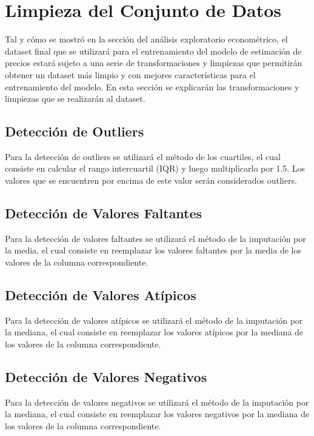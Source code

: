 \section{Limpieza del Conjunto de Datos}

Tal y cómo se mostró en la sección del análisis exploratorio econométrico, el
dataset final que se utilizará para el entrenamiento del modelo de estimación
de precios estará sujeto a una serie de transformaciones y limpiezas que
permitirán obtener un dataset más limpio y con mejores características para
el entrenamiento del modelo. En esta sección se explicarán las transformaciones
y limpiezas que se realizarán al dataset.

\subsection{Detección de Outliers}

Para la detección de outliers se utilizará el método de los cuartiles, el cual
consiste en calcular el rango intercuartil (IQR) y luego multiplicarlo por 1.5.
Los valores que se encuentren por encima de este valor serán considerados
outliers.

\subsection{Detección de Valores Faltantes}

Para la detección de valores faltantes se utilizará el método de la imputación
por la media, el cual consiste en reemplazar los valores faltantes por la media
de los valores de la columna correspondiente.

\subsection{Detección de Valores Atípicos}

Para la detección de valores atípicos se utilizará el método de la imputación
por la mediana, el cual consiste en reemplazar los valores atípicos por la
mediana de los valores de la columna correspondiente.

\subsection{Detección de Valores Negativos}

Para la detección de valores negativos se utilizará el método de la imputación
por la mediana, el cual consiste en reemplazar los valores negativos por la
mediana de los valores de la columna correspondiente.

